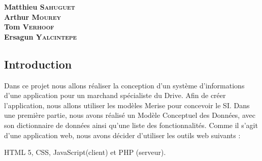 \documentclass[12pt]{report}
\newcommand{\blankpage}{
\newpage
\thispagestyle{empty}
\mbox{}
\newpage
}
\begin{document}
\blankpage



\begin{titlepage}
\ladonetTitlePage{}
\begin{center}
\vfill
\large{\textbf{Matthieu \textsc{Sahuguet}}}\\
\large{\textbf{Arthur \textsc{Mourey}}}\\
\large{\textbf{Tom \textsc{Verhoof}}}\\
\large{\textbf{Ersagun \textsc{Yalcintepe}}}\\
\vfill

\end{center}
\end{titlepage}


\begin{spacing}{1.2}

\setlength{\parskip}{16pt}

\setcounter{page}{2}

\tableofcontents





\chapter{Introduction}

Dans ce projet nous allons réaliser la conception d'un système d'informations d'une application pour un marchand spécialiste du Drive. Afin de créer l'application, nous allons utiliser les modèles Merise pour concevoir le SI. Dans une première partie, nous avons réalisé un Modèle Conceptuel des Données, avec son dictionnaire de données ainsi qu’une liste des fonctionnalités. Comme il s'agit d'une application web, nous avons décider d'utiliser les outils web suivants :

HTML 5, CSS, JavaScript(client) et PHP (serveur).


\end{spacing}
\end{document}
